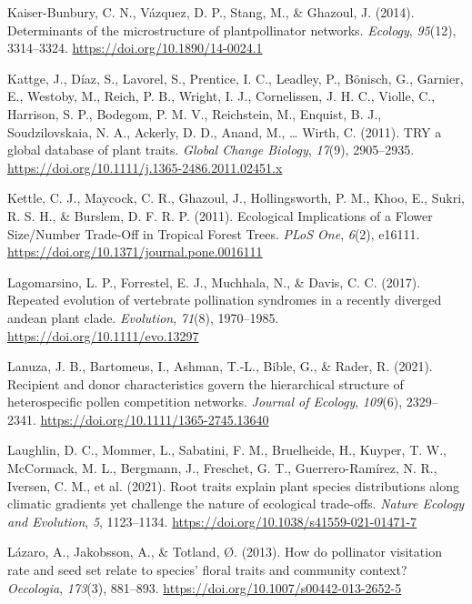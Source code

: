 \documentclass[
  12pt,
  a4paper,
]{article}
\newlength{\cslhangindent}
\newlength{\cslentryspacingunit} %
\newenvironment{CSLReferences}[2] %
 {%
  \setlength{\parindent}{0pt}
  \ifodd #1
  \let\oldpar\par
  \def\par{\hangindent=\cslhangindent\oldpar}
  \fi
  \setlength{\parskip}{#2\cslentryspacingunit}
 }%
 {}
\begin{document}
\begin{CSLReferences}{1}{0}
\leavevmode{}%
Kaiser-Bunbury, C. N., Vázquez, D. P., Stang, M., \& Ghazoul, J. (2014). Determinants of the microstructure of plant\textendash pollinator networks. \emph{Ecology}, \emph{95}(12), 3314--3324. \url{https://doi.org/10.1890/14-0024.1}

\leavevmode{}%
Kattge, J., Díaz, S., Lavorel, S., Prentice, I. C., Leadley, P., Bönisch, G., Garnier, E., Westoby, M., Reich, P. B., Wright, I. J., Cornelissen, J. H. C., Violle, C., Harrison, S. P., Bodegom, P. M. V., Reichstein, M., Enquist, B. J., Soudzilovskaia, N. A., Ackerly, D. D., Anand, M., \ldots{} Wirth, C. (2011). {TRY} \textendash{} a global database of plant traits. \emph{Global Change Biology}, \emph{17}(9), 2905--2935. \url{https://doi.org/10.1111/j.1365-2486.2011.02451.x}

\leavevmode{}%
Kettle, C. J., Maycock, C. R., Ghazoul, J., Hollingsworth, P. M., Khoo, E., Sukri, R. S. H., \& Burslem, D. F. R. P. (2011). Ecological {Implications} of a {Flower Size}/{Number Trade}-{Off} in {Tropical Forest Trees}. \emph{PLoS One}, \emph{6}(2), e16111. \url{https://doi.org/10.1371/journal.pone.0016111}

\leavevmode{}%
Lagomarsino, L. P., Forrestel, E. J., Muchhala, N., \& Davis, C. C. (2017). Repeated evolution of vertebrate pollination syndromes in a recently diverged andean plant clade. \emph{Evolution}, \emph{71}(8), 1970--1985. \url{https://doi.org/10.1111/evo.13297}

\leavevmode{}%
Lanuza, J. B., Bartomeus, I., Ashman, T.-L., Bible, G., \& Rader, R. (2021). Recipient and donor characteristics govern the hierarchical structure of heterospecific pollen competition networks. \emph{Journal of Ecology}, \emph{109}(6), 2329--2341. \url{https://doi.org/10.1111/1365-2745.13640}

\leavevmode{}%
Laughlin, D. C., Mommer, L., Sabatini, F. M., Bruelheide, H., Kuyper, T. W., McCormack, M. L., Bergmann, J., Freschet, G. T., Guerrero-Ramírez, N. R., Iversen, C. M., et al. (2021). Root traits explain plant species distributions along climatic gradients yet challenge the nature of ecological trade-offs. \emph{Nature Ecology and Evolution}, \emph{5}, 1123--1134. \url{https://doi.org/10.1038/s41559-021-01471-7}

\leavevmode{}%
Lázaro, A., Jakobsson, A., \& Totland, Ø. (2013). How do pollinator visitation rate and seed set relate to species' floral traits and community context? \emph{Oecologia}, \emph{173}(3), 881--893. \url{https://doi.org/10.1007/s00442-013-2652-5}


\end{CSLReferences}
\end{document}

